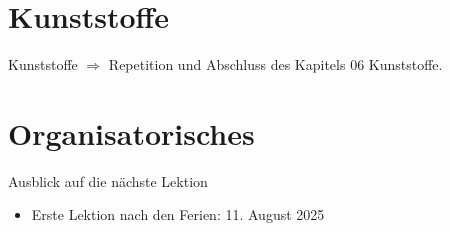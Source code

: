 
\section{Kunststoffe}
\BlueSectionSlide
\begin{frame}{Kunststoffe}
$\Rightarrow$ Repetition und Abschluss des Kapitels 06 Kunststoffe.
\end{frame}





\section{Organisatorisches}
\BlueSectionSlide






\begin{frame}{Ausblick auf die nächste Lektion}
\begin{itemize}
    \item Erste Lektion nach den Ferien: 11. August 2025
\end{itemize}

\end{frame}


